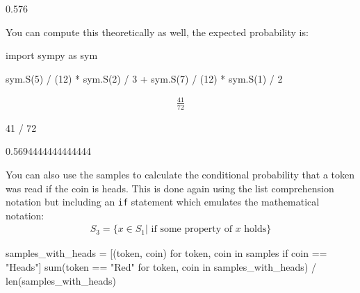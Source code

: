 \begin{raw}
0.576
\end{raw}






You can compute this theoretically as well, the expected probability is:




\begin{pyin}
import sympy as sym

sym.S(5) / (12) * sym.S(2) / 3 + sym.S(7) / (12) * sym.S(1) / 2
\end{pyin}




\begin{equation*}
\begin{split}\displaystyle \frac{41}{72}\end{split}
\end{equation*}







\begin{pyin}
41 / 72
\end{pyin}





\begin{raw}
0.5694444444444444
\end{raw}






You can also use the samples to calculate the conditional probability that a
token was read if the coin is heads. This is done again using the list
comprehension notation but including an \texttt{if} statement which 
emulates the mathematical notation:
\begin{equation*}
\begin{split}
    S_3 = \{x \in S_1  | \text{ if some property of \(x\) holds}\}
\end{split}
\end{equation*}




\begin{pyin}
samples_with_heads = [(token, coin) for token, coin in samples if coin == "Heads"]
sum(token == "Red" for token, coin in samples_with_heads) / len(samples_with_heads)
\end{pyin}





